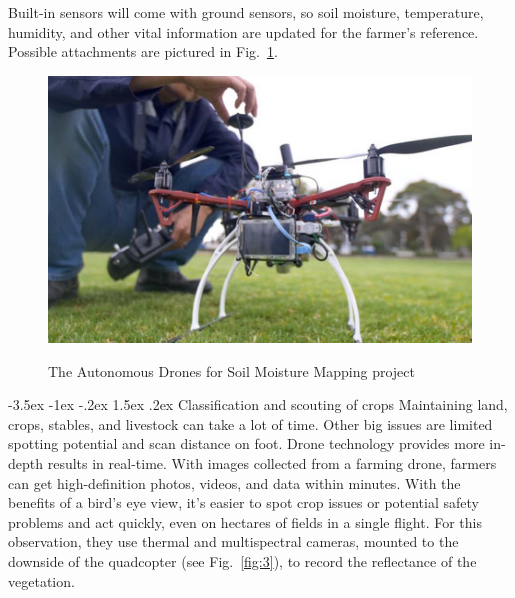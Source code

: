 \documentclass[a4paper,10pt]{article}
\makeatletter
\theoremstyle{definition}
\renewcommand\subsection{\@startsection {subsection}{1}{\z@}%
                                   {-3.5ex \@plus -1ex \@minus -.2ex}%
                                   {1.5ex \@plus.2ex}%
                                   {\normalsize\bfseries}}
\makeatother
\begin{document}
Built-in sensors will come with ground sensors, so soil moisture, temperature, humidity, and other vital information are updated for the farmer’s reference.  Possible attachments are pictured in Fig.~\ref{fig:2}. \cite{rs12030514,GOODRICH2023107591}


\begin{figure}[h]
\begin{center}
\includegraphics[scale=0.9]{images/Soil-Mapping-1-HR-.jpg}
\caption{The Autonomous Drones for Soil Moisture Mapping project}
\cite{drone_facilitates}
\label{fig:2}
\end{center}
\end{figure}

\subsection{Classification and scouting of crops}
\label{subsec:2}
Maintaining land, crops, stables, and livestock can take a lot of time. Other big issues are limited spotting potential and scan distance on foot. Drone technology provides more in-depth results in real-time. With images collected from a farming drone, farmers can get high-definition photos, videos, and data within minutes. With the benefits of a bird's eye view, it’s easier to spot crop issues or potential safety problems and act quickly, even on hectares of fields in a single flight. For this observation, they use thermal and multispectral cameras, mounted to the downside of the quadcopter (see Fig.~\ref{fig:3}), to record the reflectance of the vegetation.
\cite{drones4030041, SUBRAMANIAM2021}
\end{document}

